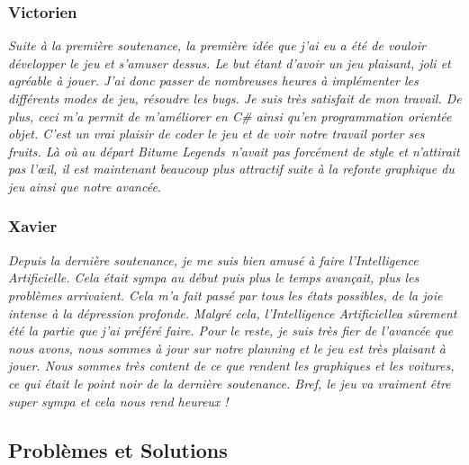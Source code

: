 \documentclass[12pt,a4paper]{article}
\newcommand{\btmlgs}{\textsl{Bitume Legends}}
\newcommand{\AI}{Intelligence Artificielle}
\begin{document}
            \subsubsection{Victorien}
                \textit{Suite à la première soutenance, la première idée que j'ai eu a été
                de vouloir développer le jeu et s'amuser dessus. Le but étant
                d'avoir un jeu plaisant, joli et agréable à jouer. J'ai donc passer
                de nombreuses heures à implémenter les différents modes de jeu, résoudre les 
                \textsl{bugs}. 
                Je suis très satisfait de mon travail. De plus, ceci m'a permit de m'améliorer en 
                \textsl{C\#} ainsi qu'en programmation orientée objet. C'est un vrai plaisir de coder 
                le jeu et de voir notre travail
                porter ses fruits. Là où au départ \btmlgs\, n'avait pas forcément de style et
                n'attirait pas l'œil, il est maintenant beaucoup plus attractif suite à
                la refonte graphique du jeu ainsi que notre avancée.}

            \subsubsection{Xavier}
                \textit{Depuis la dernière soutenance, je me suis bien amusé à faire l'\AI.
                Cela était sympa au début puis plus le temps avançait, plus les problèmes arrivaient.
                Cela m'a fait passé par tous les états possibles, de la joie intense à la dépression
                profonde. Malgré cela, l'\AI a sûrement été la partie que j'ai préféré faire.
                Pour le reste, je suis très fier de l'avancée que nous avons, nous sommes à jour sur 
                notre planning et le jeu est très plaisant à jouer. Nous sommes très content de ce que 
                rendent les graphiques et les voitures, ce qui était le point noir de la dernière 
                soutenance. Bref, le jeu va vraiment être super sympa et cela nous rend heureux ! }


        \clearpage
        \subsection{Problèmes et Solutions}
\end{document}
